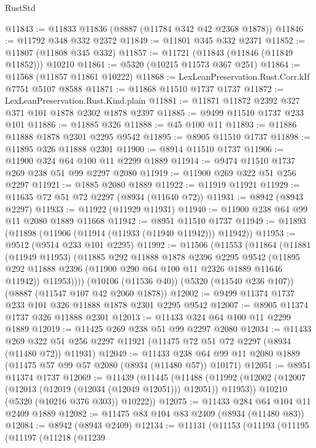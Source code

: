 \begin{lexlean}{RustStd}
\begin{coremodule}
@11843 := @11833 @11836 (@8887 (@11784 @342 @42 @2368 @1878))
@11846 := @11792 @348 @332 @2372
@11849 := @11801 @345 @332 @2371
@11852 := @11807 (@11808 @345 @332)
@11857 := @11721 (@11843 (@11846 (@11849 @11852))) @10210
@11861 := @5320 (@10215 @11573 @367 @251)
@11864 := @11568 (@11857 @11861 @10222)
@11868 := LexLeanPreservation.Rust.Corr.kIf @7751 @5107 @8588
@11871 := @11868 @11510 @1737 @1737
@11872 := LexLeanPreservation.Rust.Kind.plain
@11881 := @11871 @11872 @2392 @327 @371 @101 @1878 @2302 @1878 @2397
@11885 := @9499 @11510 @1737 @233 @101
@11886 := @11885 @326
@11888 := @45 @100 @11
@11893 := @11886 @11888 @1878 @2301 @2295 @9542
@11895 := @8905 @11510 @1737
@11898 := @11895 @326 @11888 @2301
@11900 := @8914 @11510 @1737
@11906 := @11900 @324 @64 @100 @11 @2299 @1889
@11914 := @9474 @11510 @1737 @269 @238 @51 @99 @2297 @2080
@11919 := @11900 @269 @322 @51 @256 @2297
@11921 := @1885 @2080 @1889
@11922 := @11919 @11921
@11929 := @11635 @72 @51 @72 @2297 (@8934 (@11640 @72))
@11931 := @8942 (@8943 @2297)
@11933 := @11922 (@11929 @11931)
@11940 := @11900 @238 @64 @99 @11 @2080 @1889 @11668
@11942 := @8951 @11510 @1737
@11949 := @11893 (@11898 (@11906 (@11914 (@11933 (@11940 @11942))) @11942))
@11953 := @9512 (@9514 @233 @101 @2295)
@11992 := @11506
    (@11553
      (@11864
        (@11881
          (@11949 @11953)
          (@11885
            @292
            @11888
            @1878
            @2396
            @2295
            @9542
            (@11895 @292 @11888 @2396 (@11900 @290 @64 @100 @11 @2326 @1889 @11646 @11942))
            @11953))))
    (@10106 (@11536 @40))
    (@5320 (@11540 @236 @107))
    (@8887 (@11547 @107 @42 @2060 @1878))
@12002 := @9499 @11374 @1737 @233 @101 @326 @11888 @1878 @2301 @2295 @9542
@12007 := @8905 @11374 @1737 @326 @11888 @2301
@12013 := @11433 @324 @64 @100 @11 @2299 @1889
@12019 := @11425 @269 @238 @51 @99 @2297 @2080
@12034 := @11433
    @269
    @322
    @51
    @256
    @2297
    @11921
    (@11475 @72 @51 @72 @2297 (@8934 (@11480 @72)) @11931)
@12049 := @11433 @238 @64 @99 @11 @2080 @1889 (@11475 @57 @99 @57 @2080 (@8934 (@11480 @57)) @10171)
@12051 := @8951 @11374 @1737
@12069 := @11439
    (@11445
      (@11488
        (@11992 (@12002 (@12007 (@12013 (@12019 (@12034 (@12049 @12051))) @12051)) @11953))
        @10210
        (@5320 (@10216 @376 @303))
        @10222))
@12075 := @11433 @284 @64 @104 @11 @2409 @1889
@12082 := @11475 @83 @104 @83 @2409 (@8934 (@11480 @83))
@12084 := @8942 (@8943 @2409)
@12134 := @11131
    (@11153
      (@11193
        (@11195
          (@11197
            (@11218
              (@11239

\end{coremodule}
\end{lexlean}
